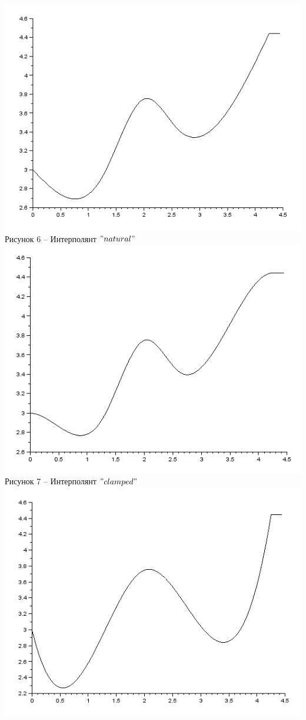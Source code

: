 \documentclass[russian, utf8, nocolumnxxxi, nocolumnxxxii, 14pt]{eskdtext}
\begin{document}
\begin{center}
\includegraphics[scale=0.65]{JPG/nat.png}\\
Рисунок 6 -- Интерполянт $"natural"$\\
\includegraphics[scale=0.65]{JPG/clm.png}\\
Рисунок 7 -- Интерполянт $"clamped"$\\
\includegraphics[scale=0.65]{JPG/not.png}\\

\end{center}
\end{document}
